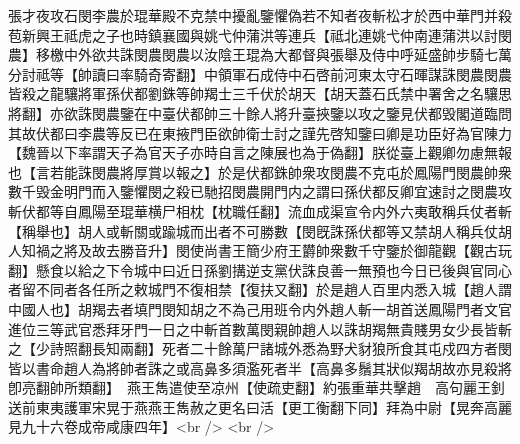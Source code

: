 張才夜攻石閔李農於琨華殿不克禁中擾亂鑒懼偽若不知者夜斬松才於西中華門并殺苞新興王祗虎之子也時鎮襄國與姚弋仲蒲洪等連兵【祗北連姚弋仲南連蒲洪以討閔農】移檄中外欲共誅閔農閔農以汝陰王琨為大都督與張舉及侍中呼延盛帥步騎七萬分討祗等【帥讀曰率騎奇寄翻】中領軍石成侍中石啓前河東太守石暉謀誅閔農閔農皆殺之龍驤將軍孫伏都劉銖等帥羯士三千伏於胡天【胡天蓋石氏禁中署舍之名驤思將翻】亦欲誅閔農鑒在中臺伏都帥三十餘人將升臺挾鑒以攻之鑒見伏都毁閣道臨問其故伏都曰李農等反已在東掖門臣欲帥衛士討之謹先啓知鑒曰卿是功臣好為官陳力【魏晉以下率謂天子為官天子亦時自言之陳展也為于偽翻】朕從臺上觀卿勿慮無報也【言若能誅閔農將厚賞以報之】於是伏都銖帥衆攻閔農不克屯於鳳陽門閔農帥衆數千毁金明門而入鑒懼閔之殺已馳招閔農開門内之謂曰孫伏都反卿宜速討之閔農攻斬伏都等自鳳陽至琨華横尸相枕【枕職任翻】流血成渠宣令内外六夷敢稱兵仗者斬【稱舉也】胡人或斬關或踰城而出者不可勝數【閔旣誅孫伏都等又禁胡人稱兵仗胡人知禍之將及故去勝音升】閔使尚書王簡少府王欝帥衆數千守鑒於御龍觀【觀古玩翻】懸食以給之下令城中曰近日孫劉搆逆支黨伏誅良善一無預也今日已後與官同心者留不同者各任所之敕城門不復相禁【復扶又翻】於是趙人百里内悉入城【趙人謂中國人也】胡羯去者填門閔知胡之不為己用班令内外趙人斬一胡首送鳳陽門者文官進位三等武官悉拜牙門一日之中斬首數萬閔親帥趙人以誅胡羯無貴賤男女少長皆斬之【少詩照翻長知兩翻】死者二十餘萬尸諸城外悉為野犬豺狼所食其屯戍四方者閔皆以書命趙人為將帥者誅之或高鼻多須濫死者半【高鼻多鬚其狀似羯胡故亦見殺將卽亮翻帥所類翻】　燕王雋遣使至凉州【使疏吏翻】約張重華共擊趙　高句麗王釗送前東夷護軍宋晃于燕燕王雋赦之更名曰活【更工衡翻下同】拜為中尉【晃奔高麗見九十六卷成帝咸康四年】<br />
<br />
